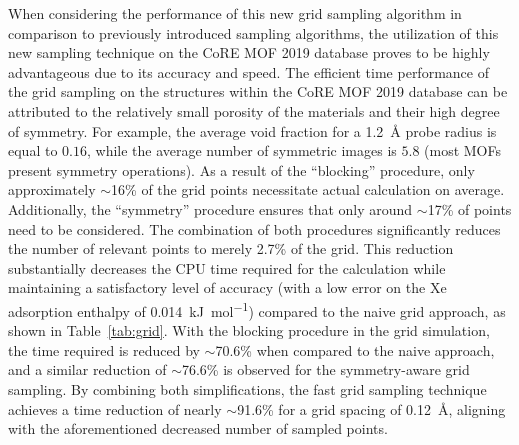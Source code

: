 \documentclass[main]{subfiles}
\begin{document}
When considering the performance of this new grid sampling algorithm in comparison to previously introduced sampling algorithms, the utilization of this new sampling technique on the CoRE MOF 2019 database proves to be highly advantageous due to its accuracy and speed. The efficient time performance of the grid sampling on the structures within the CoRE MOF 2019 database can be attributed to the relatively small porosity of the materials and their high degree of symmetry. For example, the average void fraction for a \SI{1.2}{\angstrom} probe radius is equal to $0.16$, while the average number of symmetric images is $5.8$ (most MOFs present symmetry operations). As a result of the ``blocking'' procedure, only approximately {$\sim$16\%} of the grid points necessitate actual calculation on average. Additionally, the ``symmetry'' procedure ensures that only around {$\sim$17\%} of points need to be considered. The combination of both procedures significantly reduces the number of relevant points to merely {2.7\%} of the grid. This reduction substantially decreases the CPU time required for the calculation while maintaining a satisfactory level of accuracy (with a low error on the Xe adsorption enthalpy of \SI{0.014}{\kilo\joule\per\mole}) compared to the naive grid approach, as shown in Table~\ref{tab:grid}. With the blocking procedure in the grid simulation, the time required is reduced by {$\sim$70.6\%} when compared to the naive approach, and a similar reduction of {$\sim$76.6\%} is observed for the symmetry-aware grid sampling. By combining both simplifications, the fast grid sampling technique achieves a time reduction of nearly {$\sim$91.6\%} for a grid spacing of \SI{0.12}{\angstrom}, aligning with the aforementioned decreased number of sampled points.
\end{document}
